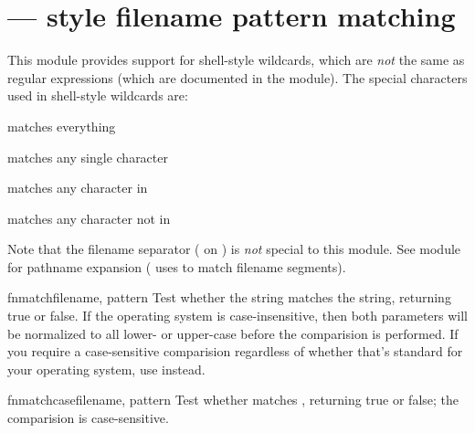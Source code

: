 \section{ ---
         \UNIX{} style filename pattern matching}



This module provides support for \UNIX{} shell-style wildcards, which
are \emph{not} the same as regular expressions (which are documented
in the  module).  The special
characters used in shell-style wildcards are:

\begin{list}{}{\leftmargin 0.5in }
\item[\code{*}] matches everything
\item[\code{?}]	matches any single character
\item[\code{[}\var{seq}\code{]}] matches any character in 
\item[\code{[!}\var{seq}\code{]}] matches any character not in 
\end{list}

Note that the filename separator ( on \UNIX{}) is \emph{not}
special to this module.  See module 
for pathname expansion ( uses  to
match filename segments).


\begin{funcdesc}{fnmatch}{filename, pattern}
Test whether the  string matches the 
string, returning true or false.  If the operating system is
case-insensitive, then both parameters will be normalized to all
lower- or upper-case before the comparision is performed.  If you
require a case-sensitive comparision regardless of whether that's
standard for your operating system, use 
instead.
\end{funcdesc}

\begin{funcdesc}{fnmatchcase}{filename, pattern}
Test whether  matches , returning true or
false; the comparision is case-sensitive.
\end{funcdesc}


\begin{seealso}
\end{seealso}
